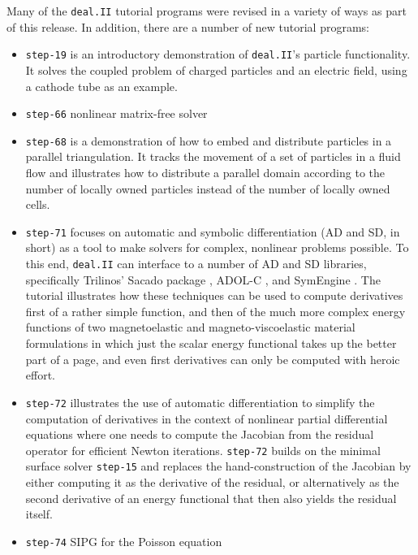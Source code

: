\documentclass{ansarticle-preprint}
\newcommand{\specialword}[1]{\texttt{#1}}
\newcommand{\dealii}{{\specialword{deal.II}}\xspace}
\begin{document}
Many of the \dealii{} tutorial programs were revised in a variety of
ways as part of this release. In addition, there are a number of new tutorial programs:
\begin{itemize}
\item \texttt{step-19} is an introductory demonstration of \dealii{}'s
  particle functionality. It solves the coupled problem of
  charged particles and an electric field, using a cathode tube as an
  example.

\item \texttt{step-66} nonlinear matrix-free solver 
  
\item \texttt{step-68} is a demonstration of how to embed and distribute
  particles in a parallel triangulation. It tracks the movement of
  a set of particles in a fluid flow and illustrates how to distribute
  a parallel domain according to the number of locally owned
  particles instead of the number of locally owned cells.

\item \texttt{step-71} focuses on automatic and symbolic
  differentiation (AD and SD, in short) as a tool to make solvers for complex,
  nonlinear problems possible. To this end, \dealii{} can interface to a number
  of AD and SD libraries, specifically Trilinos' Sacado package
  \cite{Bartlett2006a}, ADOL-C \cite{Griewank1996a}, and
  SymEngine \cite{symengine-web-page}. The tutorial
  illustrates how these techniques can be used to compute derivatives
  first of a rather simple function, and then of the much more complex
  energy functions of two magnetoelastic and magneto-viscoelastic
  material formulations in which just the scalar energy functional
  takes up the better part of a page, and even first derivatives can
  only be computed with heroic effort.

\item \texttt{step-72} illustrates the use of automatic
  differentiation to simplify the computation of derivatives in the
  context of nonlinear partial differential equations where one needs
  to compute the Jacobian from the residual operator for efficient
  Newton iterations. \texttt{step-72} builds on the minimal surface
  solver \texttt{step-15} and replaces the hand-construction of the
  Jacobian by either computing it as the derivative of the residual,
  or alternatively as the second derivative of an energy functional
  that then also yields the residual itself.

\item \texttt{step-74} SIPG for the Poisson equation 
  

\end{itemize}
\end{document}
